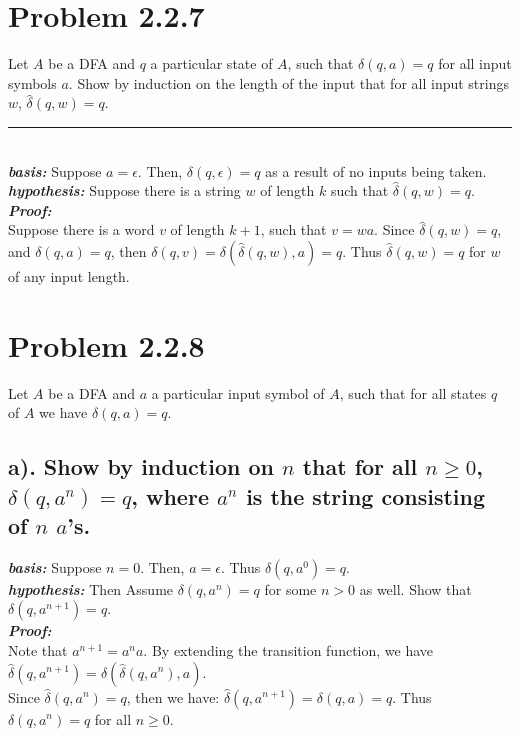 \documentclass[20pt]{article} %
\begin{document}
\section{Problem 2.2.7} 
Let $A$ be a DFA and $q$ a particular state of $A$, such that $\delta(q,a)=q$ for all input symbols $a$. 
Show by induction on the length of the input that for all input strings $w$, $\hat{\delta}(q,w)=q$. \\
\noindent\rule{2cm}{0.4pt} \\

\textbf{\textit{basis:}} Suppose $a = \epsilon$. Then, $\delta(q,\epsilon)=q$ as a result of no inputs being taken. \\
\textbf{\textit{hypothesis:}} Suppose there is a string $w$ of length $k$ such that  $\hat{\delta}(q,w)=q$. \\

\textbf{\textit{Proof:}} \\
Suppose there is a word $v$ of length $k+1$, such that $v = wa$.  Since $\hat{\delta}(q,w)=q$, and $\delta(q,a)=q$, then $\delta(q,v)=\delta(\hat{\delta}(q,w), a)=q$. Thus $\hat{\delta}(q,w)=q$ for $w$ of any input length.


\section{Problem 2.2.8}
Let $A$ be a DFA and $a$ a particular input symbol of $A$, such that for all states $q$ of $A$ we have $\delta(q,a)=q$.

\subsection{a). Show by induction on $n$ that for all $n\geq0$, $\delta(q,a^{n})=q$, where $a^{n}$ is the string consisting of $n$ $a$'s.} 

\textbf{\textit{basis:}} Suppose $n = 0$. Then, $a = \epsilon$. Thus $\delta(q,a^{0})=q$. \\
\textbf{\textit{hypothesis:}} Then Assume $\delta(q,a^{n})=q$ for some $n > 0$ as well. Show that $\delta(q,a^{n+1})=q$. \\ 

\textbf{\textit{Proof:}} \\
Note that $a^{n+1} = a^{n}a$.  By extending the transition function, we have $\hat{\delta}(q,a^{n+1})=\delta(\hat{\delta}(q,a^{n}), a).$ \\
Since $\hat{\delta}(q,a^{n}) = q$, then we have: $\hat{\delta}(q,a^{n+1})=\delta(q, a)=q$. Thus $\delta(q,a^{n})=q$ for all $n \geq 0$.
\end{document}
